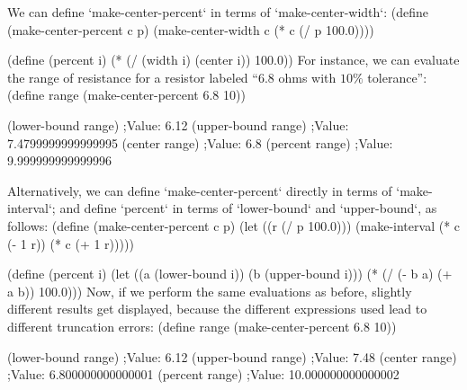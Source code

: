 We can define `make-center-percent` in terms of `make-center-width`:
\begtt\scm
(define (make-center-percent c p)
  (make-center-width c (* c (/ p 100.0))))

(define (percent i)
  (* (/ (width i) (center i)) 100.0))
\endtt
For instance, we can evaluate the range of resistance for a resistor labeled “$6.8$ ohms with $10\%$ tolerance”:
\begtt\scm
(define range (make-center-percent 6.8 10))

(lower-bound range)
;Value: 6.12
(upper-bound range)
;Value: 7.4799999999999995
(center range)
;Value: 6.8
(percent range)
;Value: 9.999999999999996
\endtt

Alternatively, we can define `make-center-percent` directly in terms of `make-interval`; and define `percent` in terms of `lower-bound` and `upper-bound`, as follows:
\begtt\scm
(define (make-center-percent c p)
  (let ((r (/ p 100.0)))
    (make-interval (* c (- 1  r)) (* c (+ 1  r)))))

(define (percent i)
  (let ((a (lower-bound i))
        (b (upper-bound i)))
    (* (/ (- b a) (+ a b)) 100.0)))
\endtt
Now, if we perform the same evaluations as before, slightly different results get displayed, because the different expressions used lead to different truncation errors:
\begtt\scm
(define range (make-center-percent 6.8 10))

(lower-bound range)
;Value: 6.12
(upper-bound range)
;Value: 7.48
(center range)
;Value: 6.800000000000001
(percent range)
;Value: 10.000000000000002
\endtt
